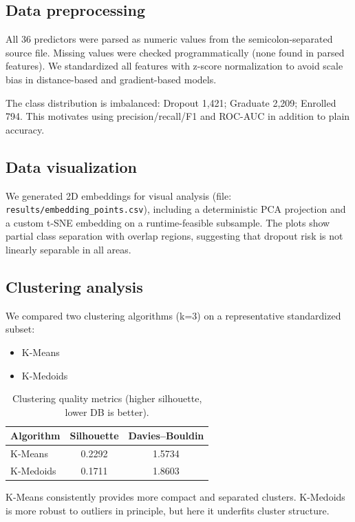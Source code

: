 \documentclass{article}
\begin{document}
\subsection{Data preprocessing}
All 36 predictors were parsed as numeric values from the semicolon-separated source file. Missing values were checked programmatically (none found in parsed features). We standardized all features with z-score normalization to avoid scale bias in distance-based and gradient-based models.

The class distribution is imbalanced: Dropout 1,421; Graduate 2,209; Enrolled 794. This motivates using precision/recall/F1 and ROC-AUC in addition to plain accuracy.

\subsection{Data visualization}
We generated 2D embeddings for visual analysis (file: \texttt{results/embedding\_points.csv}), including a deterministic PCA projection and a custom t-SNE embedding on a runtime-feasible subsample. The plots show partial class separation with overlap regions, suggesting that dropout risk is not linearly separable in all areas.

\subsection{Clustering analysis}
We compared two clustering algorithms (k=3) on a representative standardized subset:
\begin{itemize}
    \item K-Means
    \item K-Medoids
\end{itemize}

\begin{table}[h]
\centering
\caption{Clustering quality metrics (higher silhouette, lower DB is better).}
\begin{tabular}{lcc}
\toprule
Algorithm & Silhouette & Davies--Bouldin \\
\midrule
K-Means & 0.2292 & 1.5734 \\
K-Medoids & 0.1711 & 1.8603 \\
\bottomrule
\end{tabular}
\end{table}

K-Means consistently provides more compact and separated clusters. K-Medoids is more robust to outliers in principle, but here it underfits cluster structure.
\end{document}

